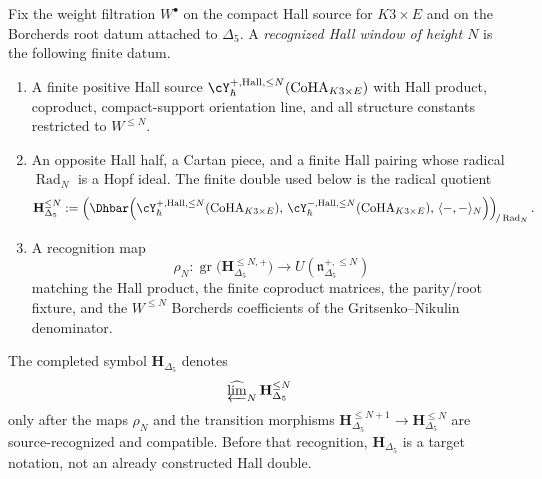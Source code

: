 \begin{definition}
\label{def:k3-finite-hall-windows}
Fix the weight filtration $W^\bullet$ on the compact
Hall source for $K3\times E$ and on the Borcherds root datum attached
to $\Delta_5$.  A \emph{recognized Hall window of height $N$} is the
following finite datum.
\begin{enumerate}[label=\textup{(\roman*)}]
\item A finite positive Hall source
 $\cY_{\hbar}^{+,\mathrm{Hall},\le N}(\operatorname{CoHA}_{K3\times E})$
 with Hall product, coproduct, compact-support orientation line, and
 all structure constants restricted to $W^{\le N}$.
\item An opposite Hall half, a Cartan piece, and a finite Hall pairing
 whose radical $\operatorname{Rad}_N$ is a Hopf ideal.  The finite
 double used below is the radical quotient
\[
 \mathbf H_{\Delta_5}^{\le N}
 :=
 \left(
 \Dhbar\!\left(
 \cY_{\hbar}^{+,\mathrm{Hall},\le N}(\operatorname{CoHA}_{K3\times E}),\,
 \cY_{\hbar}^{-,\mathrm{Hall},\le N}(\operatorname{CoHA}_{K3\times E}),\,
 \langle-,-\rangle_N
 \right)
 \right)_{\!/\operatorname{Rad}_N}.
\]
\item A recognition map
\[
 \rho_N\colon
 \operatorname{gr}\bigl(\mathbf H_{\Delta_5}^{\le N,+}\bigr)
 \longrightarrow
 U\!\left(\mathfrak n_{\Delta_5}^{+,\le N}\right)
\]
 matching the Hall product, the finite coproduct matrices, the
 parity/root fixture, and the $W^{\le N}$ Borcherds coefficients of
 the Gritsenko--Nikulin denominator.
\end{enumerate}
The completed symbol $\mathbf H_{\Delta_5}$ denotes
\[
 \widehat{\varprojlim}_{N}\,\mathbf H_{\Delta_5}^{\le N}
\]
only after the maps $\rho_N$ and the transition morphisms
$\mathbf H_{\Delta_5}^{\le N+1}\to\mathbf H_{\Delta_5}^{\le N}$
are source-recognized and compatible.  Before that recognition,
$\mathbf H_{\Delta_5}$ is a target notation, not an already
constructed Hall double.
\end{definition}

